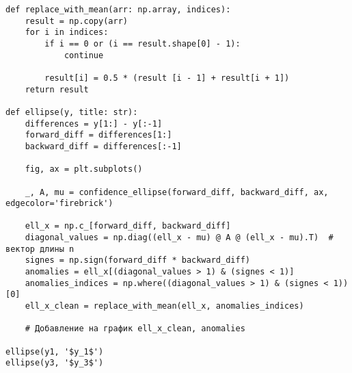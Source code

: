 {
	\vspace{-1.5em}
	\label{plot_ellipse}
	\begin{verbatim}
def replace_with_mean(arr: np.array, indices):
	result = np.copy(arr)
	for i in indices:
		if i == 0 or (i == result.shape[0] - 1):
			continue
	
		result[i] = 0.5 * (result [i - 1] + result[i + 1])
	return result
	
def ellipse(y, title: str):
	differences = y[1:] - y[:-1]
	forward_diff = differences[1:]
	backward_diff = differences[:-1]
	
	fig, ax = plt.subplots()
	
	_, A, mu = confidence_ellipse(forward_diff, backward_diff, ax, edgecolor='firebrick')
	
	ell_x = np.c_[forward_diff, backward_diff]
	diagonal_values = np.diag((ell_x - mu) @ A @ (ell_x - mu).T)  # вектор длины n
	signes = np.sign(forward_diff * backward_diff)
	anomalies = ell_x[(diagonal_values > 1) & (signes < 1)]
	anomalies_indices = np.where((diagonal_values > 1) & (signes < 1))[0]
	ell_x_clean = replace_with_mean(ell_x, anomalies_indices)
	
	# Добавление на график ell_x_clean, anomalies

ellipse(y1, '$y_1$')
ellipse(y3, '$y_3$')
	\end{verbatim}
}

